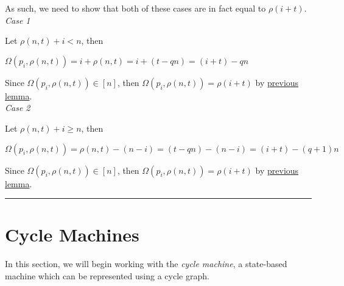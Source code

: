\documentclass[a4paper,12pt]{article}
\begin{document}
\noindent As such, we need to show that both of these cases are in fact equal to $\rho(i + t)$.\\


\noindent
\textit{Case 1}

\noindent Let $\rho(n, t) + i < n$, then 
\begin{center}
$\Omega(p_i, \rho(n, t)) = i + \rho(n, t) = i + (t - qn) = (i + t) - qn$
\end{center}
Since $\Omega(p_i, \rho(n, t)) \in [n]$, then $\Omega(p_i, \rho(n, t)) = \rho(i + t)$ by \hyperlink{lemma:remainder_subtraction}{previous lemma}.\\


\noindent
\textit{Case 2}

\noindent Let $\rho(n, t) + i \geq n$, then 
\begin{center}
$\Omega(p_i, \rho(n, t)) = \rho(n, t) - (n - i) = (t - qn) - (n - i) = (i + t) - (q + 1)n$
\end{center}

\noindent Since $\Omega(p_i, \rho(n, t)) \in [n]$, then $\Omega(p_i, \rho(n, t)) = \rho(i + t)$ by \hyperlink{lemma:remainder_subtraction}{previous lemma}.


\begin{center}
\noindent\rule{8cm}{0.4pt}
\end{center}







\section{Cycle Machines}
\label{section:cycle_machines}
\hypertarget{section:cycle_machines}{}

\noindent In this section, we will begin working with the \textit{cycle machine}, a state-based machine which can be represented using a cycle graph.\\
\end{document}
